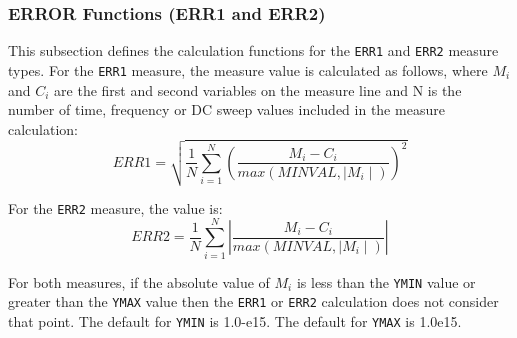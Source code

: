 \subsubsection{ERROR Functions (ERR1 and ERR2)}
\label{Measure_Error_Functions}
This subsection defines the calculation functions for the \texttt{ERR1} and
\texttt{ERR2} measure types.  For the \texttt{ERR1} measure, the measure
value is calculated as follows, where $M_i$ and $C_i$ are the first and
second variables on the measure line and N is the number of time, frequency
or DC sweep values included in the measure calculation:
\begin{equation}
ERR1 = \sqrt{ \frac{1}{N}\sum_{i=1}^{N} \left(\frac{M_i - C_i}{max(MINVAL,\mid M_i \mid)}\right)^2}
\end{equation}

For the \texttt{ERR2} measure, the value is:
\begin{equation}
ERR2 = \frac{1}{N}\sum_{i=1}^{N} \left|\frac{M_i - C_i}{max(MINVAL,\mid M_i \mid)}\right|
\end{equation}

For both measures, if the absolute value of $M_i$ is less than the
\texttt{YMIN} value or greater than the \texttt{YMAX} value then the
{\tt ERR1} or {\tt ERR2} calculation does not consider that point. The
default for \texttt{YMIN} is 1.0-e15.  The default for \texttt{YMAX}
is 1.0e15.

